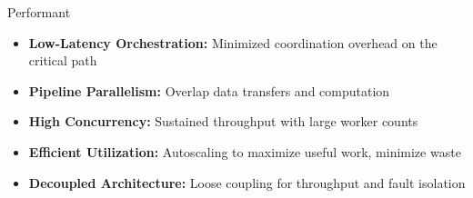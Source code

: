 \begin{frame}{Performant}
	\begin{itemize}
		\item \textbf{Low-Latency Orchestration:} Minimized coordination overhead on the critical path
		\item \textbf{Pipeline Parallelism:} Overlap data transfers and computation
		\item \textbf{High Concurrency:} Sustained throughput with large worker counts
		\item \textbf{Efficient Utilization:} Autoscaling to maximize useful work, minimize waste
		\item \textbf{Decoupled Architecture:} Loose coupling for throughput and fault isolation
	\end{itemize}
\end{frame}

